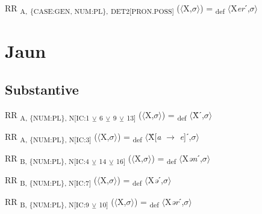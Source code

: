 {\begin{exe}
 RR \textsubscript{A,} \textsubscript{\{CASE:GEN, NUM:PL\},} \textsubscript{DET2[PRON.POSS]} ($\langle$X,$\sigma $$\rangle$) = \textsubscript{def} $\langle$X\textit{er}ˊ,$\sigma $$\rangle$
\end{exe}

\section{Jaun}

\subsection{Substantive}

\begin{exe}
 RR \textsubscript{A, \{NUM:PL\}, N[IC:1} \textsubscript{${\veebar}$}\textsubscript{ 6} \textsubscript{${\veebar}$}\textsubscript{ 9} \textsubscript{${\veebar}$}\textsubscript{ 13]} ($\langle$X,$\sigma $$\rangle$) = \textsubscript{def} $\langle$Ẍˊ,$\sigma $$\rangle$
\end{exe}

\begin{exe}
 RR \textsubscript{A, \{NUM:PL\}, N[IC:3]} ($\langle$X,$\sigma $$\rangle$) = \textsubscript{def} $\langle$Ẍ[\textit{a} $\rightarrow$ \textit{e}]ˊ,$\sigma $$\rangle$
\end{exe}

\begin{exe}
 RR \textsubscript{B, \{NUM:PL\}, N[IC:4} \textsubscript{${\veebar}$}\textsubscript{ 14} \textsubscript{${\veebar}$}\textsubscript{ 16]} ($\langle$X,$\sigma $$\rangle$) = \textsubscript{def} $\langle$X\textit{ən}ˊ,$\sigma $$\rangle$
\end{exe}

\begin{exe}
 RR \textsubscript{B, \{NUM:PL\}, N[IC:7]} ($\langle$X,$\sigma $$\rangle$) = \textsubscript{def} $\langle$X\textit{ə}ˊ,$\sigma $$\rangle$
\end{exe}

\begin{exe}
 RR \textsubscript{B, \{NUM:PL\}, N[IC:9} \textsubscript{${\veebar}$}\textsubscript{ 10]} ($\langle$X,$\sigma $$\rangle$) = \textsubscript{def} $\langle$X\textit{ər}ˊ,$\sigma $$\rangle$
\end{exe}

}
